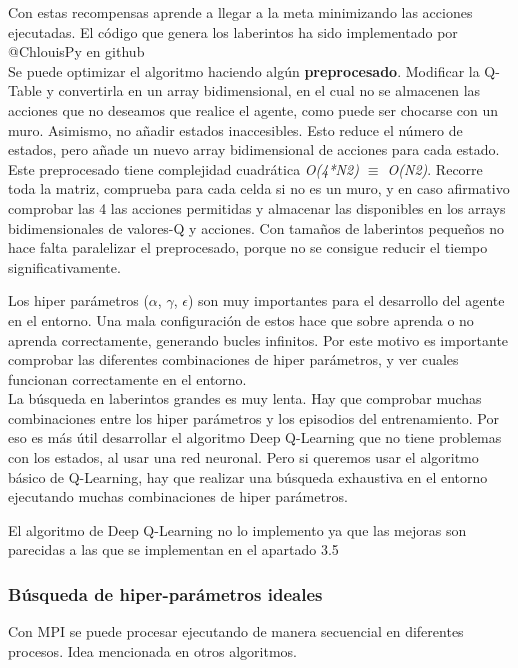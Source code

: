 	Con estas recompensas aprende a llegar a la meta minimizando las acciones ejecutadas. El código que genera los laberintos ha sido implementado por @ChlouisPy en github\cite{MazeGenerator}\\

	
	
	Se puede optimizar el algoritmo haciendo algún \textbf{preprocesado}.
	Modificar la Q-Table y convertirla en un array bidimensional, en el cual no se almacenen las acciones que no deseamos que realice el agente, como puede ser chocarse con un muro. Asimismo, no añadir estados inaccesibles. Esto reduce el número de estados, pero añade un nuevo array bidimensional de acciones para cada estado. Este preprocesado tiene complejidad cuadrática \textit{O(4*N2) $\equiv$ O(N2)}. Recorre toda la matriz, comprueba para cada celda si no es un muro, y en caso afirmativo comprobar las 4 las acciones permitidas y almacenar las disponibles en los arrays bidimensionales  de valores-Q y acciones. Con tamaños de laberintos pequeños no hace falta paralelizar el preprocesado, porque no se consigue reducir el tiempo significativamente.
	
	Los hiper parámetros ($\alpha$, $\gamma$, $\epsilon$) son muy importantes para el desarrollo del agente en el entorno. Una mala configuración de estos hace que sobre aprenda o no aprenda correctamente, generando bucles infinitos. Por este motivo es importante comprobar las diferentes combinaciones de hiper parámetros, y ver cuales funcionan correctamente en el entorno.\\
	
	La búsqueda en laberintos grandes es muy lenta. Hay que comprobar muchas combinaciones entre los hiper parámetros y los episodios del entrenamiento. Por eso es más útil desarrollar el algoritmo Deep Q-Learning que no tiene problemas con los estados, al usar una red neuronal. Pero si queremos usar el algoritmo básico de Q-Learning, hay que realizar una búsqueda exhaustiva en el entorno ejecutando muchas  combinaciones de hiper parámetros.
	
	\color{red}El algoritmo de Deep Q-Learning no lo implemento ya que las mejoras son parecidas a las que se implementan en el apartado 3.5
	\color{black}
	
	
	\subsubsection{Búsqueda de hiper-parámetros ideales}
	
	Con MPI se puede procesar ejecutando de manera secuencial en diferentes procesos. Idea mencionada en otros algoritmos. 
	
